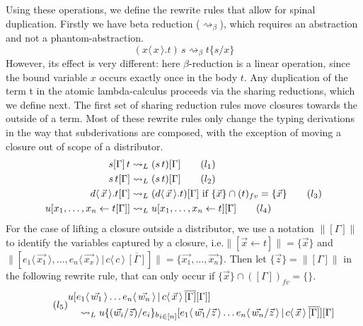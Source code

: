 \documentclass[a4paper,UKenglish,cleveref, autoref]{lipics-v2019}
\newcommand{\fv}[1]{(#1)_{fv}}
\newcommand{\set}[1]{ \{ #1 \} }
\newcommand{\app}[2]{#1 \, #2}
\newcommand{\fake}[3]{#1 \langle \, #2 \, \rangle . #3}
\newcommand{\share}[3]{#1 [#2 \leftarrow #3]}
\newcommand{\dist}[5]{#1 [ #2 \, \vert \, \fakedist{#4}{#5} \, #3 ]}
\newcommand{\fakedist}[2]{#1 \langle \, #2 \, \rangle}
\newcommand{\sub}[3]{#1 \{ #2 / #3 \}}
\newcommand{\psub}[3]{#1 \{ #2 / #3 \}_{b}}
\newcommand{\bindvars}[1]{\parallel#1\parallel}
\begin{document}
Using these operations, we define the rewrite rules that allow for spinal duplication. Firstly we have beta reduction ($\rightsquigarrow_{\beta}$), which requires an abstraction and not a phantom-abstraction.
\begin{equation}  \label{red:beta} \tag{$\beta$}
\app{(\fake{x}{x}{t})}{s} \rightsquigarrow_{\beta} \sub{t}{s}{x}
\end{equation}
However, its effect is very different: here $\beta$-reduction is a linear operation, since the bound variable $x$ occurs exactly once in the body $t$. Any duplication of the term t in the atomic lambda-calculus proceeds via the sharing reductions, which we define next. The first set of sharing reduction rules move closures towards the outside of a term. Most of these rewrite rules only change the typing derivations in the way that subderivations are composed, with the exception of moving a closure out of scope of a distributor. 
\begin{align}
\app{s[\Gamma]}{t} &\rightsquigarrow_{L} (\app{s}{t})[\Gamma]   \label{red:liftappleft} \tag{$l_{1}$} \\
\app{s}{t[\Gamma]} &\rightsquigarrow_{L} (\app{s}{t})[\Gamma] \label{red:liftappright} \tag{$l_{2}$} \\
\fake{d}{\vec{x}}{t[\Gamma]} &\rightsquigarrow_{L} (\fake{d}{\vec{x}}{t})[\Gamma]  \text{ if } \set{\vec{x}} \cap \fv{t} = \set{\vec{x}}  \label{red:liftabs} \tag{$l_{3}$} \\
\share{u}{x_{1}, \dots, x_{n}}{t[\Gamma]} &\rightsquigarrow_{L} \share{u}{x_{1}, \dots, x_{n}}{t}[\Gamma] \label{red:liftshare} \tag{$l_{4}$}
\end{align}
For the case of lifting a closure outside a distributor, we use a notation $\bindvars{[\Gamma]}$ to identify the variables captured by a closure, i.e.$\bindvars{\share{}{\vec{x}}{t}} = \set{\vec{x}}$ and $\bindvars{\dist{}{\fakedist{e_{1}}{\vec{x_{1}}}, \dots, \fakedist{e_{n}}{\vec{x_{x}}}}{\overline{[\Gamma]}}{c}{c}} = \set{\vec{x_{1}}, \dots, \vec{x_{n}}}$. Then let $\set{\vec{z}} = \bindvars{[\Gamma]}$ in the following rewrite rule, that can only occur if $\set{\vec{x}} \cap \fv{[\Gamma]} = \set{}$.
\begin{equation} \label{red:distshare} \tag{$l_{5}$}
\begin{multlined}
\dist{u}{\fakedist{e_{1}}{\vec{w_{1}}} \dots \fakedist{e_{n}}{\vec{w_{n}}}}{\overline{[\Gamma]} [\Gamma]}{c}{\vec{x}} \\ \rightsquigarrow_{L} \dist{u {\psub{}{(\vec{w_{i}} / \vec{z})}{e_{i}}}_{i \in [n]}}{\fakedist{e_{1}}{\vec{w_{1}} / \vec{z}} \dots \fakedist{e_{n}}{\vec{w_{n}} / \vec{z}}}{\overline{[\Gamma]}}{c}{\vec{x}}[\Gamma] 
\end{multlined}
\end{equation}
\end{document}
